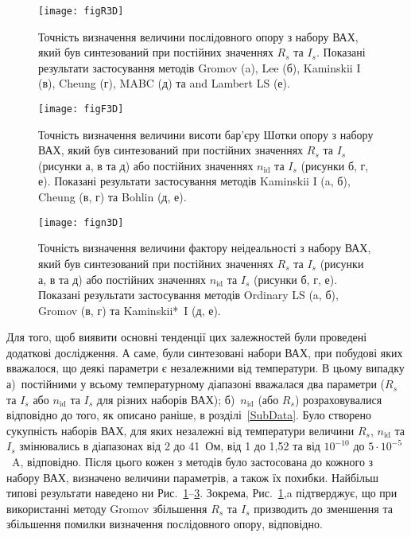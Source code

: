 \begin{figure}
\center
\texttt{[image: figR3D]}%
\caption{\label{figR3D}
Точність визначення величини послідовного опору з набору ВАХ, який був синтезований при постійних значеннях $R_s$ та $I_s$.
Показані результати застосування методів Gromov (a), Lee (б), Kaminskii I (в), Cheung (г), MABC (д) та and Lambert LS (е).
}
\end{figure}

\begin{figure}
\center
\texttt{[image: figF3D]}%
\caption{\label{figF3D}
Точність визначення величини висоти бар'єру Шотки опору з набору ВАХ, який був синтезований при постійних значеннях $R_s$ та $I_s$ (рисунки а, в та д) або постійних значеннях $n_\mathrm{id}$ та $I_s$ (рисунки б, г, е).
Показані результати застосування методів Kaminskii I (a, б), Cheung (в, г) та Bohlin (д, е).
}
\end{figure}


\begin{figure}
\center
\texttt{[image: fign3D]}%
\caption{\label{fign3D}
Точність визначення величини фактору неідеальності з набору ВАХ, який був синтезований при постійних значеннях $R_s$ та $I_s$ (рисунки а, в та д) або постійних значеннях $n_\mathrm{id}$ та $I_s$ (рисунки б, г, е).
Показані результати застосування методів Ordinary LS (a, б), Gromov (в, г) та Kaminskii*~I (д, е).
}
\end{figure}

Для того, щоб виявити основні тенденції цих залежностей були проведені додаткові дослідження.
А саме, були синтезовані набори ВАХ, при побудові яких вважалося, що деякі параметри є незалежними від температури.
В цьому випадку
а)~постійними у всьому температурному діапазоні вважалася два параметри ($R_s$ та $I_s$  або $n_\mathrm{id}$ та $I_s$ для різних наборів ВАХ);
б)~$n_\mathrm{id}$ (або $R_s$) розраховувалися відповідно до того, як описано раніше, в розділі~\ref{SubData}.
Було створено сукупність наборів ВАХ, для яких незалежні від температури величини $R_s$, $n_\mathrm{id}$ та $I_s$ змінювались в діапазонах від
2 до 41~Ом, від 1 до 1,52 та від $10^{-10}$ до $5\cdot10^{-5}$~A, відповідно.
Після цього кожен з методів було застосована до кожного з набору ВАХ, визначено величини параметрів, а також їх похибки.
Найбільш типові результати наведено ни Рис.~\ref{figR3D}--\ref{fign3D}.
Зокрема, Рис.~\ref{figR3D},a підтверджує, що при використанні методу Gromov збільшення $R_s$ та $I_s$ призводить до зменшення та збільшення помилки визначення послідовного опору, відповідно.


